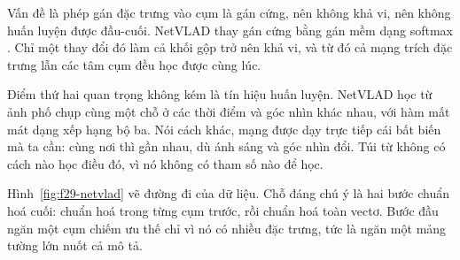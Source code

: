 \documentclass[../../deep_learning.tex]{subfiles}
\begin{document}
Vấn đề là phép gán đặc trưng vào cụm là gán cứng, nên không khả vi, nên không huấn luyện được đầu-cuối. NetVLAD thay gán cứng bằng gán mềm dạng softmax \cite{f29arandjelovic2016netvlad}. Chỉ một thay đổi đó làm cả khối gộp trở nên khả vi, và từ đó cả mạng trích đặc trưng lẫn các tâm cụm đều học được cùng lúc.

Điểm thứ hai quan trọng không kém là tín hiệu huấn luyện. NetVLAD học từ ảnh phố chụp cùng một chỗ ở các thời điểm và góc nhìn khác nhau, với hàm mất mát dạng xếp hạng bộ ba. Nói cách khác, mạng được dạy trực tiếp cái bất biến mà ta cần: cùng nơi thì gần nhau, dù ánh sáng và góc nhìn đổi. Túi từ không có cách nào học điều đó, vì nó không có tham số nào để học.

Hình~\ref{fig:f29-netvlad} vẽ đường đi của dữ liệu. Chỗ đáng chú ý là hai bước chuẩn hoá cuối: chuẩn hoá trong từng cụm trước, rồi chuẩn hoá toàn vectơ. Bước đầu ngăn một cụm chiếm ưu thế chỉ vì nó có nhiều đặc trưng, tức là ngăn một mảng tường lớn nuốt cả mô tả.
\end{document}
